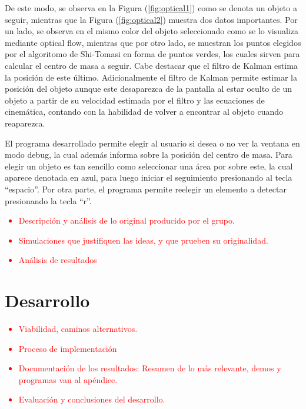 De este modo, se observa en la Figura (\ref{fig:optical1}) como se denota un objeto a seguir, mientras que la Figura (\ref{fig:optical2}) muestra dos datos importantes. Por un lado, se observa en el mismo color del objeto seleccionado como se lo visualiza mediante optical flow, mientras que por otro lado, se muestran los puntos elegidos por el algoritomo de Shi-Tomasi en forma de puntos verdes, los cuales sirven para calcular el centro de masa a seguir. Cabe destacar que el filtro de Kalman estima la posición de este último. Adicionalmente el filtro de Kalman permite estimar la posición del objeto aunque este desaparezca de la pantalla al estar oculto de un objeto a partir de su velocidad estimada por el filtro y las ecuaciones de cinemática, contando con la habilidad de volver a encontrar al objeto cuando reaparezca.

El programa desarrollado permite elegir al usuario si desea o no ver la ventana en modo debug, la cual además informa sobre la posición del centro de masa. Para elegir un objeto es tan sencillo como seleccionar una área por sobre este, la cual aparece denotada en azul, para luego iniciar el seguimiento presionando al tecla ``espacio''. Por otra parte, el programa permite reelegir un elemento a detectar presionando la tecla ``r''.


\textcolor{red}{
\begin{itemize}
	\item Descripción y análisis de lo original producido por el grupo.
	\item Simulaciones que justifiquen las ideas, y que prueben su originalidad.
	\item Análisis de resultados
\end{itemize}
}

\section{Desarrollo}

\textcolor{red}{
\begin{itemize}
	\item Viabilidad, caminos alternativos.
	\item Proceso de implementación
	\item Documentación de los resultados: Resumen de lo más relevante, demos y programas van al apéndice.
	\item Evaluación y conclusiones del desarrollo.
\end{itemize}
}



